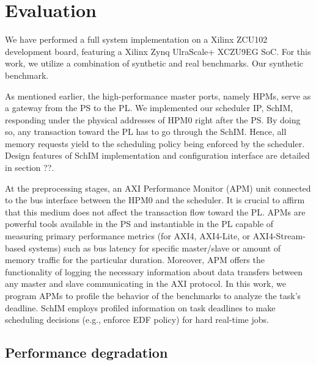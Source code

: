 \section{Evaluation}

We have performed a full system implementation on a Xilinx ZCU102 development board, featuring a Xilinx Zynq UlraScale+ XCZU9EG SoC. For this work, we utilize a combination of synthetic and real benchmarks. Our synthetic benchmark.

As mentioned earlier, the high-performance master ports, namely HPMs, serve as a gateway from the PS to the PL. We implemented our scheduler IP, SchIM, responding under the physical addresses of HPM0 right after the PS. By doing so, any transaction toward the PL has to go through the SchIM. Hence, all memory requests yield to the scheduling policy being enforced by the scheduler. Design features of SchIM implementation and configuration interface are detailed in section ??.


At the preprocessing stages, an AXI Performance Monitor (APM) unit connected to the bus interface between the HPM0 and the scheduler. It is crucial to affirm that this medium does not affect the transaction flow toward the PL.  APMs are powerful tools available in the PS and instantiable in the PL capable of measuring primary performance metrics (for AXI4, AXI4-Lite, or AXI4-Stream-based systems) such as bus latency for specific master/slave or amount of memory traffic for the particular duration. Moreover, APM offers the functionality of logging the necessary information about data transfers between any master and slave communicating in the AXI protocol. In this work, we program APMs to profile the behavior of the benchmarks to analyze the task's deadline. SchIM employs profiled information on task deadlines to make scheduling decisions (e.g., enforce EDF policy) for hard real-time jobs.

  \subsection{Performance degradation}
  
